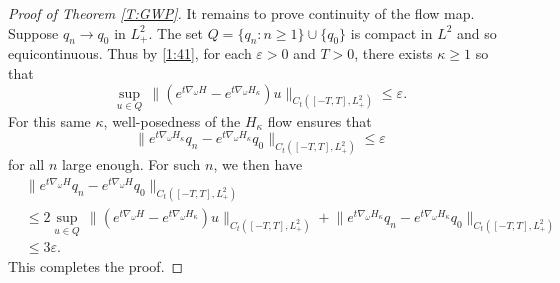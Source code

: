 \documentclass{amsart}
\numberwithin{equation}{section}
\theoremstyle{definition}
\newcommand{\om}{\omega}
\newcommand{\ka}{\kappa}
\newcommand{\eps}{\varepsilon}
\newcommand{\na}{\nabla}
\begin{document}
\begin{proof}[Proof of Theorem \ref{T:GWP}]
It remains to prove continuity of the flow map. Suppose $q_n\rightarrow q_0$ in $L^2_+$.  The set $Q=\{q_n:n\geq1\}\cup\{q_0\}$ is compact in $L^2$ and so equicontinuous. Thus by \eqref{1:41}, for each $\eps>0$ and $T>0$, there exists $\ka\geq1$ so that
$$
\sup_{u\in Q}\,\bigl\|(e^{t\na_\om H}-e^{t\na_\om H_\ka})u\bigr\|_{C_t([-T,T],L^2_+)}\leq\eps.
$$
For this same $\ka$, well-posedness of the $H_\ka$ flow ensures that 
$$
\bigl\|e^{t\na_\om H_\ka}q_n-e^{t\na_\om H_\ka}q_0\bigr\|_{C_t([-T,T],L^2_+)}\leq\eps
$$
for all $n$ large enough. For such $n$, we then have
\begin{align*}
&\bigl\|e^{t\na_\om H}q_n-e^{t\na_\om H}q_0\bigr\|_{C_t([-T,T],L^2_+)}\\
&\leq 2\sup_{u\in Q}\, \bigl\|(e^{t\na_\om H}-e^{t\na_\om H_\ka})u\bigr\|_{C_t([-T,T],L^2_+)}+\bigl\|e^{t\na_\om H_\ka}q_n-e^{t\na_\om H_\ka}q_0\bigr\|_{C_t([-T,T],L^2_+)}\\
&\leq3\eps.
\end{align*}
This completes the proof. 
\end{proof}


\end{document}
